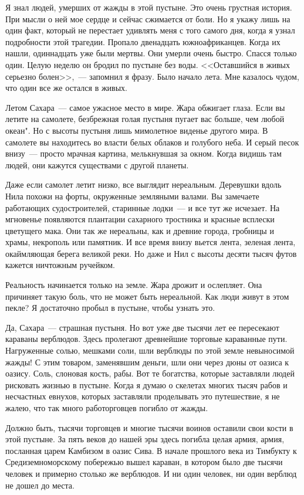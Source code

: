 \documentclass[12pt,a4paper,twoside,openany,svgnames]{memoir}
\begin{document}
Я знал людей, умерших от жажды в этой пустыне. Это очень грустная история. При мысли о ней мое сердце и сейчас сжимается от боли. Но я укажу лишь на один факт, который не перестает удивлять меня с того самого дня, когда я узнал подробности этой трагедии. Пропало двенадцать южноафриканцев. Когда их нашли, одиннадцать уже были мертвы. Они умерли очень быстро. Спасся только один. Целую неделю он бродил по пустыне без воды. <<Оставшийся в живых серьезно болен>>,~--- запомнил я фразу. Было начало лета. Мне казалось чудом, что один все же остался в живых.

Летом Сахара~--- самое ужасное место в мире. Жара обжигает глаза. Если вы летите на самолете, безбрежная голая пустыня пугает вас больше, чем любой океан". Но с высоты пустыня лишь мимолетное виденье другого мира. В самолете вы находитесь во власти белых облаков и голубого неба. И серый песок внизу~--- просто мрачная картина, мелькнувшая за окном. Когда видишь там людей, они кажутся существами с другой планеты.

Даже если самолет летит низко, все выглядит нереальным. Деревушки вдоль Нила похожи на форты, окруженные земляными валами. Вы замечаете работающих судостроителей, старинные лодки~--- и все тут же исчезает. На мгновенье появляются плантации сахарного тростника и красные всплески цветущего мака. Они так же нереальны, как и древние города, гробницы и храмы, некрополь или памятник. И все время внизу вьется лента, зеленая лента, окаймляющая берега великой реки. Но даже и Нил с высоты десяти тысяч футов кажется ничтожным ручейком.

Реальность начинается только на земле. Жара дрожит и ослепляет. Она причиняет такую боль, что не может быть нереальной. Как люди живут в этом пекле? Я достаточно пробыл в пустыне, чтобы узнать это.

Да, Сахара~--- страшная пустыня. Но вот уже две тысячи лет ее пересекают караваны верблюдов. Здесь пролегают древнейшие торговые караванные пути. Нагруженные солью, мешками соли, шли верблюды по этой земле невыносимой жажды! С этим товаром, заменявшим деньги, шли они через дюны от оазиса к оазису. Соль, слоновая кость, рабы. Вот те богатства, которые заставляли людей рисковать жизнью в пустыне. Когда я думаю о скелетах многих тысяч рабов и несчастных евнухов, которых заставляли проделывать это путешествие, я не жалею, что так много работорговцев погибло от жажды.

Должно быть, тысячи торговцев и многие тысячи воинов оставили свои кости в этой пустыне. За пять веков до нашей эры здесь погибла целая армия, армия, посланная царем Камбизом в оазис Сива. В начале прошлого века из Тимбукту к Средиземноморскому побережью вышел караван, в котором было две тысячи человек и примерно столько же верблюдов. И ни один человек, ни один верблюд не дошел до места.
\end{document}
